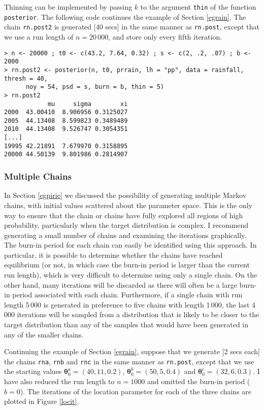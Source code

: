 \documentclass[11pt,a4paper]{article}
\newcommand{\bs}{\boldsymbol}
\begin{document}
Thinning can be implemented by passing $k$ to the argument \verb+thin+ of the function \verb+posterior+.
The following code continues the example of Section \ref{egrain}.
The chain \verb+rn.post2+ is generated [40 secs] in the same manner as \verb+rn.post+, except that we use a run length of $n=20\,000$, and store only every fifth iteration. 

\begin{verbatim}
> n <- 20000 ; t0 <- c(43.2, 7.64, 0.32) ; s <- c(2, .2, .07) ; b <- 2000
> rn.post2 <- posterior(n, t0, prrain, lh = "pp", data = rainfall, thresh = 40, 
      noy = 54, psd = s, burn = b, thin = 5)
> rn.post2
            mu     sigma        xi
2000  43.00410  8.906956 0.3125027
2005  44.13408  8.599823 0.3489489
2010  44.13408  9.526747 0.3054351
[...]
19995 42.21891  7.679970 0.3158895
20000 44.50139  9.801986 0.2814907
\end{verbatim}

\subsubsection{Multiple Chains}
\label{multiple}

In Section \ref{egpirie} we discussed the possibility of generating multiple Markov chains, with initial values scattered about the parameter space.
This is the only way to ensure that the chain or chains have fully explored all regions of high probability, particularly when the target distribution is complex.
I recommend generating a small number of chains and examining the iterations graphically.
The burn-in period for each chain can easily be identified using this approach.
In particular, it is possible to determine whether the chains have reached equilibrium (or not, in which case the burn-in period is larger than the current run length), which is very difficult to determine using only a single chain.  
On the other hand, many iterations will be discarded as there will often be a large burn-in period associated with each chain.
Furthermore, if a single chain with run length 5\,000 is generated in preference to five chains with length 1\,000, the last 4\,000 iterations will be sampled from a distribution that is likely to be closer to the target distribution than any of the samples that would have been generated in any of the smaller chains.

Continuing the example of Section \ref{egrain}, suppose that we generate [2 secs each] the chains \verb+rna+, \verb+rnb+ and \verb+rnc+ in the same manner as \verb+rn.post+, except that we use the starting values $\bs{\theta}_0^a=(40,11,0.2)$, $\bs{\theta}_0^b=(50,5,0.4)$ and $\bs{\theta}_0^c=(32,6,0.3)$.
I have also reduced the run length to $n=1000$ and omitted the burn-in period ($b=0$).
The iterations of the location parameter for each of the three chains are plotted in Figure \ref{locit}.
\end{document}
